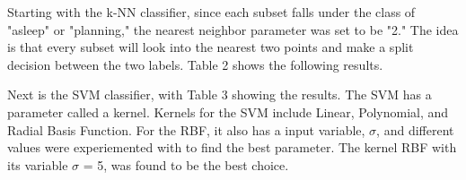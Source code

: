 \documentclass[conference,compsoc]{IEEEtran}
\begin{document}
Starting with the k-NN classifier, since each subset falls under the class of "asleep" or "planning," the nearest neighbor parameter 
was set to be "2." The idea is that every subset will look into the nearest two points and make a split decision between the two labels. 
Table 2 shows the following results.
\begin{table*}
	\noindent{}
	\caption{Accuracies for k-NN Classifier}
	\label{table2}
\end{table*}

Next is the SVM classifier, with Table 3 showing the results. The SVM has a parameter called a kernel. Kernels for the SVM include Linear, Polynomial, and Radial Basis Function. 
For the RBF, it also has a input variable,  $\sigma$, and different values were experiemented with to find the best parameter. The kernel RBF with its 
variable $\sigma$ = 5, was found to be the best choice.
\begin{table*}
	\noindent{}
	\caption{Accuracies for SVM Classifier}
	\label{table3}
\end{table*}
\end{document}

